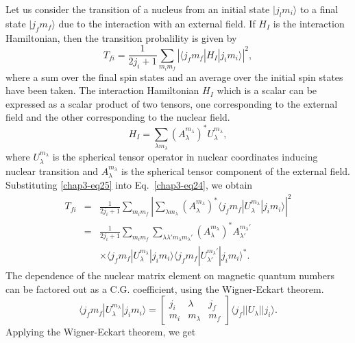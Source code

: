 Let us consider the transition of a nucleus from an initial state $|j_l m_i \rangle$ to a final state $| j_f m_f \rangle$ due to the interaction with an external field. If $H_I$ is the interaction Hamiltonian, then the transition probalility is given by
\setcounter{equation}{23}
\begin{equation}
  T_{fi} = \frac{1}{2j_i +1} \sum_{m_i m_f} | \langle j_f m_f |H_I| j_i m_i \rangle |^2, \label{chap3-eq24}
\end{equation}
where a sum over the final spin states and an average over the initial spin states have been taken. The interaction Hamiltonian $H_I$ which is a scalar can be expressed as a scalar product of two tensors, one corresponding to the external field and the other corresponding to the nuclear field.
\begin{equation}
  H_I = \sum_{\lambda m_\lambda} (A_\lambda^{m_\lambda})^\ast U_\lambda^{m_\lambda}, \label{chap3-eq25}
\end{equation}
where $U_\lambda^{m_\lambda}$ is the spherical tensor operator in nuclear coordinates inducing nuclear transition and $A_\lambda^{m_\lambda}$ is the spherical tensor component of the external field. Substituting \eqref{chap3-eq25} into Eq.\ \eqref{chap3-eq24}, we obtain
\begin{eqnarray}
T_{fi} &=&  \frac{1}{2j_i +1}\sum_{m_i m_f}\left| \sum_{\lambda m_{\lambda}}
\left(A_\lambda^{m_\lambda}\right)^*
\langle j_f m_f| U_\lambda^{m_\lambda}|j_i m_i \rangle \right|^2
\nonumber \\
&=& \frac{1}{2j_i +1}\sum_{m_i m_f} \sum_{\lambda \lambda' m_\lambda
	m_\lambda'}\left( A_\lambda^{m_\lambda}\right)^* A_{\lambda'}^{m_\lambda'}\nonumber\\
& &\times \langle j_f m_f|U_\lambda^{m_\lambda}| j_i m_i \rangle
\langle j_f m_f|U_{\lambda'}^{m_\lambda'}| j_i m_i \rangle^*.
\label{chap3-eq26}
\end{eqnarray}
The dependence of the nuclear matrix element on magnetic quantum numbers can be factored out as a C.G. coefficient, using the Wigner-Eckart theorem.
\begin{equation}
  \langle j_f m_f | U_\lambda^{m_\lambda}| j_i m_i\rangle =
  \begin{bmatrix} j_i & \lambda & j_f\\ m_i & m_\lambda & m_f \end{bmatrix} \langle j_f || U_\lambda|| j_i \rangle . \label{chap3-eq27}
\end{equation}
Applying the Wigner-Eckart theorem, we get
